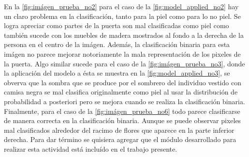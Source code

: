En la \cref{fig:imágen_prueba_no2} para el caso de la \cref{fig:model_applied_no2} hay un claro problema en la clasificación, tanto para la piel como para lo no piel. Se logra apreciar como partes de la puerta son mal clasificadas como piel como también sucede con los muebles de madera mostrados al fondo a la derecha de la persona en el centro de la imágen. Además, la clasificación binaria para esta imágen no parece mejorar notoriamente la mala representación de los pixeles de la puerta. Algo similar sucede para el caso de la \cref{fig:imágen_prueba_no3}, donde la aplicación del modelo a ésta se muestra en la \cref{fig:model_applied_no3}, se obverva que la sombra que se produce por el sombrero del individuo vestido con camisa negra se mal clasifica originalmente como piel al usar la distribución de probabilidad a posteriori pero se mejora cuando se realiza la clasificación binaria. Finalmente, para el caso de la \cref{fig:imágen_prueba_no6} todo parece clasificarse de manera correcta en la clasificación binaria. Aunque se puede observar pixeles mal clasificados alrededor del racimo de flores que aparece en la parte inferior derecha. Para dar término se quisiera agregar que el módulo desarrollado para realizar esta actividad está incluído en el trabajo presente.

